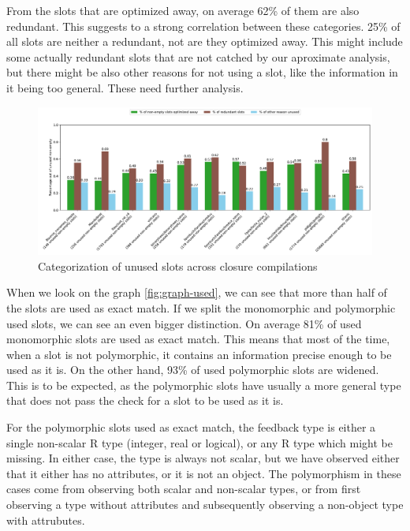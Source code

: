 From the slots that are optimized away, on average 62\% of them are also redundant. This suggests to a strong correlation between these categories. 25\% of all slots are neither a redundant, not are they optimized away. This might include some actually redundant slots that are not catched by our aproximate analysis, but there might be also other reasons for not using a slot, like the information in it being too general. These need further analysis.

\begin{figure}
	\centering
	\begin{adjustwidth}{-3cm}{-3cm}
		\includegraphics[width=1.5\textwidth]{figures/unused.pdf}
	\end{adjustwidth}
	\caption{Categorization of unused slots across closure compilations}\label{fig:graph-unused}
\end{figure}

When we look on the graph \ref{fig:graph-used}, we can see that more than half of the slots are used as exact match. If we split the monomorphic and polymorphic used slots, we can see an even bigger distinction. On average 81\% of used monomorphic slots are used as exact match. This means that most of the time, when a slot is not polymorphic, it contains an information precise enough to be used as it is. On the other hand, 93\% of used polymorphic slots are widened. This is to be expected, as the polymorphic slots have usually a more general type that does not pass the check for a slot to be used as it is.

For the polymorphic slots used as exact match, the feedback type is either a single non-scalar R type (integer, real or logical), or any R type which might be missing. In either case, the type is always not scalar, but we have observed either that it either has no attributes, or it is not an object. The polymorphism in these cases come from observing both scalar and non-scalar types, or from first observing a type without attributes and subsequently observing a non-object type with attrubutes.

